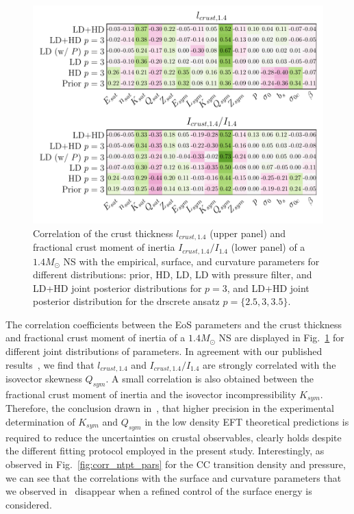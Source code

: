 \begin{figure}[!t]
  \begin{center}
    \includegraphics[width=\linewidth]{figures/corr_crustobs_pars.pdf}
  \end{center}
  \caption[{Correlation of the crust thickness and fractional crust moment 
    of inertia of a $1.4M_\odot$ neutron star with the equation of state 
    parameters for different filters}]{{Correlation of the crust thickness 
    $l_{crust,1.4}$ (upper panel) and fractional crust moment of inertia
    $I_{crust,1.4}/I_{1.4}$ (lower panel) of a $1.4M_\odot$ NS with the
    empirical, surface, and curvature parameters for different distributions: 
    prior, HD, LD, LD with pressure filter, and LD+HD joint posterior 
    distributions for $p=3$, and LD+HD joint posterior distribution for the 
drscrete ansatz $p=\{2.5,3,3.5\}$.}}\label{fig:corr_crustobs_pars}
\end{figure}
%
{
The correlation coefficients between the EoS parameters and the crust thickness
and fractional crust moment of inertia of a $1.4M_\odot$ NS are displayed in
Fig.~\ref{fig:corr_crustobs_pars} for different joint distributions of 
parameters. In agreement with our published results~\cite{Carreau2019moi}, we 
find that $l_{crust,1.4}$ and $I_{crust,1.4}/I_{1.4}$ are strongly correlated 
with the isovector skewness $Q_{sym}$. A small correlation is also obtained
between the fractional crust moment of inertia and the isovector
incompressibility $K_{sym}$. Therefore, the conclusion drawn 
in~\cite{Carreau2019moi}, that higher precision in the experimental 
determination of $K_{sym}$ and $Q_{sym}$ in the 
low density EFT theoretical predictions is required to reduce the uncertainties 
on crustal observables, clearly holds despite the different fitting protocol 
employed in the present study. 
Interestingly, as observed in Fig.~\ref{fig:corr_ntpt_pars} for 
the CC transition density and pressure, we can see that the correlations with 
the surface and curvature parameters that we observed in~\cite{Carreau2019moi} 
disappear when a refined control of the surface energy is considered.
}

